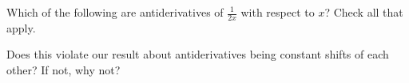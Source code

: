 \documentclass{ximera}
\author{Steven Gubkin}
\begin{document}
\begin{exercise}



Which of the following are antiderivatives of $\frac{1}{2x}$ with respect to $x$?  Check all that apply.

\begin{selectAll}
\end{selectAll}

Does this violate our result about antiderivatives being constant shifts of each other?  If not, why not?

\end{exercise}
\end{document}
